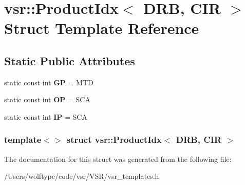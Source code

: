 \hypertarget{structvsr_1_1_product_idx_3_01_d_r_b_00_01_c_i_r_01_4}{\section{vsr\-:\-:Product\-Idx$<$ D\-R\-B, C\-I\-R $>$ Struct Template Reference}
\label{structvsr_1_1_product_idx_3_01_d_r_b_00_01_c_i_r_01_4}
}
\subsection*{Static Public Attributes}
\begin{DoxyCompactItemize}
\item 
\hypertarget{structvsr_1_1_product_idx_3_01_d_r_b_00_01_c_i_r_01_4_a8fc3dddbf0e2e00df3bf72e6dbf54d23}{static const int {\bfseries G\-P} = M\-T\-D}\label{structvsr_1_1_product_idx_3_01_d_r_b_00_01_c_i_r_01_4_a8fc3dddbf0e2e00df3bf72e6dbf54d23}

\item 
\hypertarget{structvsr_1_1_product_idx_3_01_d_r_b_00_01_c_i_r_01_4_a2dd2ef5aef9537223abcd275a99194ff}{static const int {\bfseries O\-P} = S\-C\-A}\label{structvsr_1_1_product_idx_3_01_d_r_b_00_01_c_i_r_01_4_a2dd2ef5aef9537223abcd275a99194ff}

\item 
\hypertarget{structvsr_1_1_product_idx_3_01_d_r_b_00_01_c_i_r_01_4_afbbb6fa0c4d3e2576debc31a43c290c8}{static const int {\bfseries I\-P} = S\-C\-A}\label{structvsr_1_1_product_idx_3_01_d_r_b_00_01_c_i_r_01_4_afbbb6fa0c4d3e2576debc31a43c290c8}

\end{DoxyCompactItemize}
\subsubsection*{template$<$$>$ struct vsr\-::\-Product\-Idx$<$ D\-R\-B, C\-I\-R $>$}



The documentation for this struct was generated from the following file\-:\begin{DoxyCompactItemize}
\item 
/\-Users/wolftype/code/vsr/\-V\-S\-R/vsr\-\_\-templates.\-h\end{DoxyCompactItemize}
